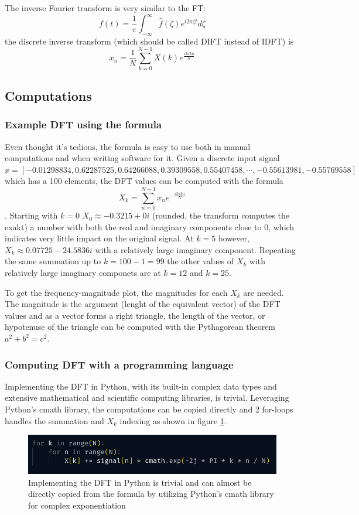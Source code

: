 The inverse Fourier transform is very similar to the FT:
$$ f(t) = \frac{1}{\pi}\int_{-\infty}^{\infty} \hat{f}(\zeta)e^{i2\pi\zeta t} d\zeta$$
the discrete inverse transform (which should be called DIFT instead of IDFT) is 
$$ x_n = \frac{1}{N}\sum_{k=0}^{N-1} X(k)e^{\frac{i2\pi kn}{N}}$$

\subsection{Computations}
\subsubsection{Example DFT using the formula}
Even thought it's tedious, the formula is easy to use both in manual computations and when writing software for it. Given a discrete input signal $x = [-0.01298834,  0.62287525,  0.64266088,  0.39309558,  0.55407458, \cdots , -0.55613981, -0.55769558]$ which has a 100 elements, the DFT values can be computed with the formula $$X_k = \sum_{n=0}^{N-1} x_ne^{-\frac{i2\pi kn}{N}}$$. Starting with $k=0$ $X_0 \approx -0.3215+0i$ (rounded, the transform computes the exakt) a number with both the real and imaginary components close to 0, which indicates very little impact on the original signal. At $k=5$ however, $X_k \approx 0.07725-24.5836i$ with a relatively large imaginary component. Repeating the same summation up to $k=100-1 = 99$ the other values of $X_k$ with relatively large imaginary componets are at $k=12$ and $k=25$. 

To get the frequency-magnitude plot, the magnitudes for each $X_k$ are needed. The magnitude is the argument (lenght of the equivalent vector) of the DFT values and as a vector forms a right triangle, the length of the vector, or hypotenuse of the triangle can be computed with the Pythagorean theorem $a^2 + b^2 = c^2$. 
\subsubsection{Computing DFT with a programming language}
Implementing the DFT in Python, with its built-in complex data types and extensive mathematical and scientific computing libraries, is trivial. Leveraging Python's cmath library, the computations can be copied directly and 2 for-loops handles the summation and $X_k$ indexing as shown in figure \ref{fig:pyDFT}.

\begin{figure}[ht]
    \centering
    \includegraphics[width=\textwidth]{./images/pyDFT.png}
    \caption{Implementing the DFT in Python is trivial and can almost be directly copied from the formula by utilizing Python's cmath library for complex exponentiation \label{fig:pyDFT}}
\end{figure}

